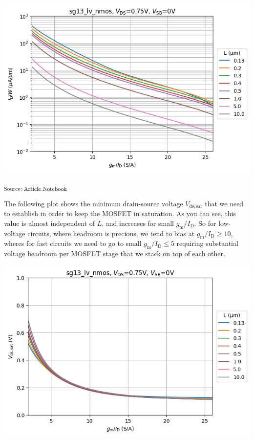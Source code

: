 \documentclass[
  a4paper,
  DIV=11,
  numbers=noendperiod]{scrartcl}
\begin{document}
\includegraphics{index_files/figure-latex/.-sizing-techsweep_sg13_plots_nmos-cell-11-output-1.png}

\textsubscript{Source:
\href{https://iic-jku.github.io/analog-circuit-design/index.qmd.html}{Article
Notebook}}

The following plot shows the minimum drain-source voltage
\(V_\mathrm{ds,sat}\) that we need to establish in order to keep the
MOSFET in saturation. As you can see, this value is almost independent
of \(L\), and increases for small \(g_\mathrm{m}/I_\mathrm{D}\). So for
low-voltage circuits, where headroom is precious, we tend to bias at
\(g_\mathrm{m}/I_\mathrm{D}\ge 10\), wheres for fast circuits we need to
go to small \(g_\mathrm{m}/I_\mathrm{D}\le 5\) requiring substantial
voltage headroom per MOSFET stage that we stack on top of each other.

\includegraphics{index_files/figure-latex/.-sizing-techsweep_sg13_plots_nmos-cell-12-output-1.png}
\end{document}
